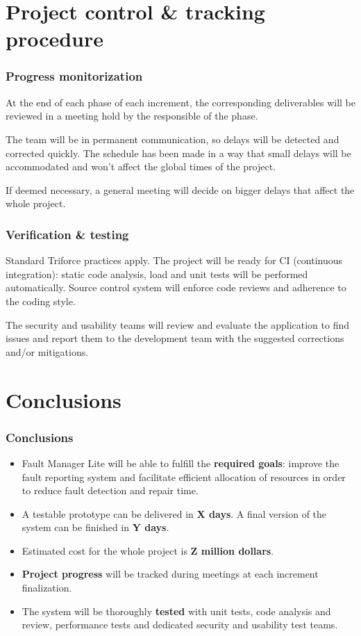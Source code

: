 \documentclass[10pt, compress,usetitleprogressbar,aspectratio=1610]{beamer}
\begin{document}
\section{Project control \& tracking procedure}

\begin{frame}
\frametitle{Progress monitorization}
At the end of each phase of each increment, the corresponding deliverables will be reviewed in a meeting hold by the responsible of the phase.

The team will be in permanent communication, so delays will be detected and corrected quickly. The schedule has been made in a way that small delays will be accommodated and won't affect the global times of the project.

If deemed necessary, a general meeting will decide on bigger delays that affect the whole project.
\end{frame}

\begin{frame}
\frametitle{Verification \& testing}
Standard Triforce practices apply. The project will be ready for CI (continuous integration): static code analysis, load and unit tests will be performed automatically. Source control system will enforce code reviews and adherence to the coding style.

The security and usability teams will review and evaluate the application to find issues and report them to the development team with the suggested corrections and/or mitigations.
\end{frame}

\section{Conclusions}

\begin{frame}
\frametitle{Conclusions}

\begin{itemize}
\item Fault Manager Lite will be able to fulfill the \textbf{required goals}: improve the fault reporting system and facilitate efficient allocation of resources in order to reduce fault detection and repair time.
\item A testable prototype can be delivered in \textbf{X days}. A final version of the system can be finished in \textbf{Y days}.
\item Estimated cost for the whole project is \textbf{Z million dollars}.
\item \textbf{Project progress} will be tracked during meetings at each increment finalization.
\item The system will be thoroughly \textbf{tested} with unit tests, code analysis and review, performance tests and dedicated security and usability test teams.
\end{itemize}

\end{frame}

\end{document}
